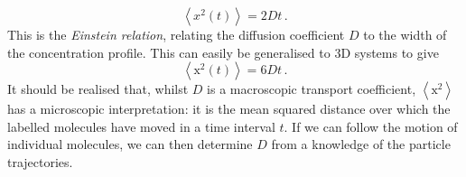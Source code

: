 \documentclass{article}
\theoremstyle{plain}\theoremheaderfont{\normalfont\bfseries}\theorembodyfont{\rmfamily}\theoremseparator{.}\newtheorem*{thm}{Theorem}\newtheorem*{law}{Law}\newtheorem*{pos}{Postulate}
\numberwithin{equation}{section}
\newcommand{\eval}[1]{\left\langle #1 \right\rangle}
\newcommand{\vb}[1]{\bm{\mathrm{#1}}}
\begin{document}
    \begin{equation}
        \eval{x^2(t)}=2Dt\,.
    \end{equation}
    This is the \textit{Einstein relation}, relating the diffusion coefficient \(D\) to the width of the concentration profile. This can easily be generalised to 3D systems to give
    \begin{equation}
        \eval{\vb{x}^2(t)}=6Dt\,.
    \end{equation}
    It should be realised that, whilst \(D\) is a macroscopic transport coefficient, \(\eval{\vb{x}^2}\) has a microscopic interpretation: it is the mean squared distance over which the labelled molecules have moved in a time interval \(t\). If we can follow the motion of individual molecules, we can then determine \(D\) from a knowledge of the particle trajectories.
\end{document}
